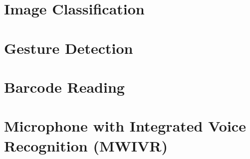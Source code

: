 \documentclass[10pt,a4paper,bibliography=totoc]{scrbook}
\begin{document}
{{}

\Ausblenden
{
  
	
}

\Ausblenden
{	
\part{Image Classification}

}

\Ausblenden
{
\part{}
 
  
} 

\Ausblenden
{
\part{Gesture Detection}

  
}

\Ausblenden
{
    
\part{Barcode Reading}

}  

\Ausblenden
{
  \part{Microphone with Integrated Voice Recognition (MWIVR)}
 
   
  
  
}

}
\end{document}
